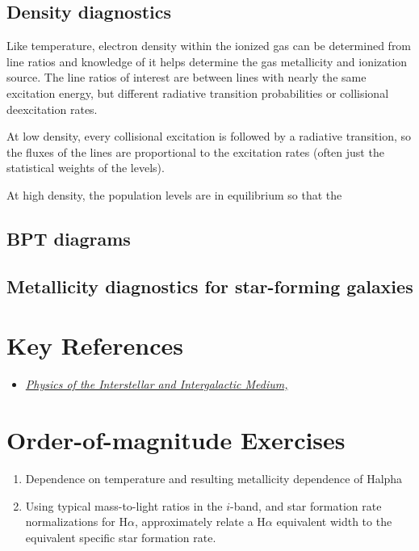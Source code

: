 \subsection{Density diagnostics}

Like temperature, electron density within the ionized gas can be
determined from line ratios and knowledge of it helps determine the
gas metallicity and ionization source. The line ratios of interest are
between lines with nearly the same excitation energy, but different
radiative transition probabilities or collisional deexcitation rates.

At low density, every collisional excitation is followed by a
radiative transition, so the fluxes of the lines are proportional to
the excitation rates (often just the statistical weights of the
levels). 

At high density, the population levels are in equilibrium so that the 

\subsection{BPT diagrams}

\subsection{Metallicity diagnostics for star-forming galaxies}

\section{Key References}

\begin{itemize}
  \item
    \href{http://}
    {\it Physics of the Interstellar and Intergalactic Medium,
      \citet{draine07a}}
\end{itemize}

\section{Order-of-magnitude Exercises}

\begin{enumerate} 
\item Dependence on temperature and resulting metallicity dependence
  of Halpha 
\item Using typical mass-to-light ratios in the $i$-band, and star
formation rate normalizations for H$\alpha$, approximately relate a
H$\alpha$ equivalent width to the equivalent specific star formation
rate.
\end{enumerate}   


